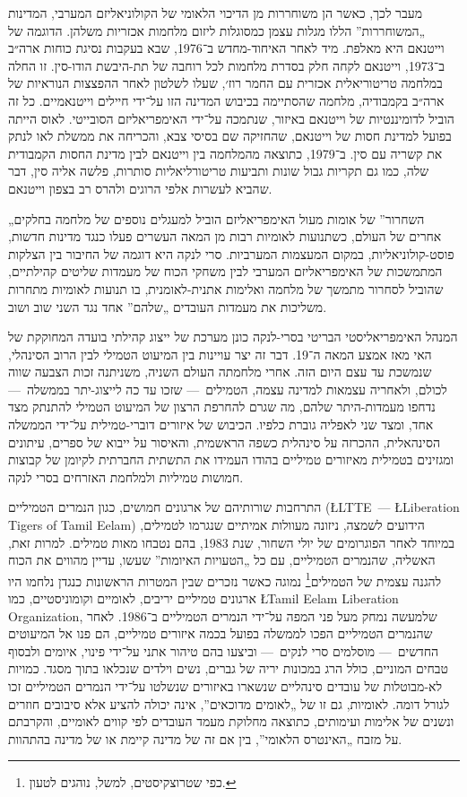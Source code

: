 מעבר לכך, כאשר הן משוחררות מן הדיכוי הלאומי של הקולוניאליזם המערבי, המדינות „המשוחררות” הללו מגלות עצמן כמסוגלות ליזום מלחמות אכזריות משלהן. הדוגמה של וייטנאם היא מאלפת. מיד לאחר האיחוד-מחדש ב־1976, שבא בעקבות נסיגת כוחות ארה״ב ב־1973, וייטנאם לקחה חלק בסדרת מלחמות לכל רוחבה של תת-היבשת הודו-סין. זו החלה במלחמה טריטוריאלית אכזרית עם החמר רוז׳, שעלו לשלטון לאחר ההפצצות הנוראיות של ארה״ב בקמבודיה, מלחמה שהסתיימה בכיבוש המדינה הזו על־ידי חיילים וייטנאמיים. כל זה הוביל לדומיננטיות של וייטנאם באיזור, שנתמכה על־ידי האימפריאליזם הסובייטי. לאוס הייתה בפועל למדינת חסות של וייטנאם, שהחזיקה שם בסיסי צבא, והכריחה את ממשלת לאו לנתק את קשריה עם סין. ב־1979, כתוצאה מהמלחמה בין וייטנאם לבין מדינת החסות הקמבודית שלה, כמו גם תקריות גבול שונות ותביעות טריטורליאליות סותרות, פלשה אליה סין, דבר שהביא לעשרות אלפי הרוגים ולהרס רב בצפון וייטנאם.

„השחרור” של אומות מעול האימפריאליזם הוביל למעגלים נוספים של מלחמה בחלקים אחרים של העולם, כשתנועות לאומיות רבות מן המאה העשרים פעלו כנגד מדינות חדשות, פוסט-קולוניאליות, במקום המעצמות המערביות. סרי לנקה היא דוגמה של החיבור בין הצלקות המתמשכות של האימפריאליזם המערבי לבין משחקי הכוח של מעמדות שליטים קהילתיים, שהוביל לסחרור מתמשך של מלחמה ואלימות אתנית-לאומנית, בו תנועות לאומיות מתחרות משליכות את מעמדות העובדים „שלהם” אחד נגד השני שוב ושוב.

המנהל האימפריאליסטי הבריטי בסרי-לנקה כונן מערכת של ייצוג קהילתי בועדה המחוקקת של האי מאז אמצע המאה ה־19. דבר זה יצר עויינות בין המיעוט הטמילי לבין הרוב הסינהלי, שנמשכת עד עצם היום הזה. אחרי מלחמתה העולם השניה, משניתנה זכות הצבעה שווה לכולם, ולאחריה עצמאות למדינה עצמה, הטמילים~— שזכו עד כה לייצוג-יתר בממשלה~— נדחפו מעמדות-היתר שלהם, מה שגרם להחרפת הרצון של המיעוט הטמילי להתנתק מצד אחד, ומצד שני לאפליה גוברת כלפיו. הכיבוש של איזורים דוברי-טמילית על־ידי הממשלה הסינהאלית, ההכרזה על סינהלית כשפה הראשמית, והאיסור על ייבוא של ספרים, עיתונים ומגזינים בטמילית מאיזורים טמיליים בהודו העמידו את התשתית החברתית לקיומן של קבוצות חמושות טמיליות ולמלחמת האזרחים בסרי לנקה.

התרחבות שורותיהם של ארגונים חמושים, כגון הנמרים הטמיליים (\L{LTTE}~— \L{Liberation Tigers of Tamil Eelam}) הידועים לשמצה, ניזונה מעוולות אמיתיים שנגרמו לטמילים, במיוחד לאחר הפוגרומים של יולי השחור, שנת 1983, בהם נטבחו מאות טמילים. למרות זאת, האשליה, שהנמרים הטמיליים, עם כל „הטעויות האיומות” שעשו, עדיין מהווים את הכוח להגנה עצמית של הטמילים\footnote{כפי שטרוצקיסטים, למשל, נוהגים לטעון.} נמוגה כאשר נזכרים שבין המטרות הראשונות כנגדן נלחמו היו ארגונים טמיליים יריבים, לאומיים וקומוניסטיים, כמו \L{Tamil Eelam Liberation Organization}, שלמעשה נמחק מעל פני המפה על־ידי הנמרים הטמיליים ב־1986. לאחר שהנמרים הטמיליים הפכו לממשלה בפועל בכמה איזורים טמיליים, הם פנו אל המיעוטים החדשים~— מוסלמים סרי לנקים~— וביצעו בהם טיהור אתני על־ידי פינוי, איומים ולבסוף טבחים המוניים, כולל הרג במכונות יריה של גברים, נשים וילדים שנכלאו בתוך מסגד. כמויות לא-מבוטלות של עובדים סינהליים שנשארו באיזורים שנשלטו על־ידי הנמרים הטמיליים זכו לגורל דומה. לאומיות, גם זו של „לאומים מדוכאים”, אינה יכולה להציע אלא סיבובים חוזרים ונשנים של אלימות ועימותים, כתוצאה מחלוקת מעמד העובדים לפי קווים לאומיים, והקרבתם על מזבח „האינטרס הלאומי”, בין אם זה של מדינה קיימת או של מדינה בהתהוות.


